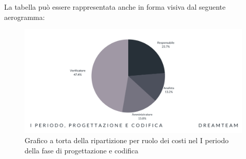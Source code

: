 La tabella può essere rappresentata anche in forma visiva dal seguente aerogramma:
\begin{figure}[!h]
\centering
\includegraphics[scale=0.65]{Sezioni/SezioniPreventivo/grafici/Progettazione_I_periodo_costi.png}
\caption{Grafico a torta della ripartizione per ruolo dei costi nel I periodo della fase di progettazione e codifica}
\end{figure}




